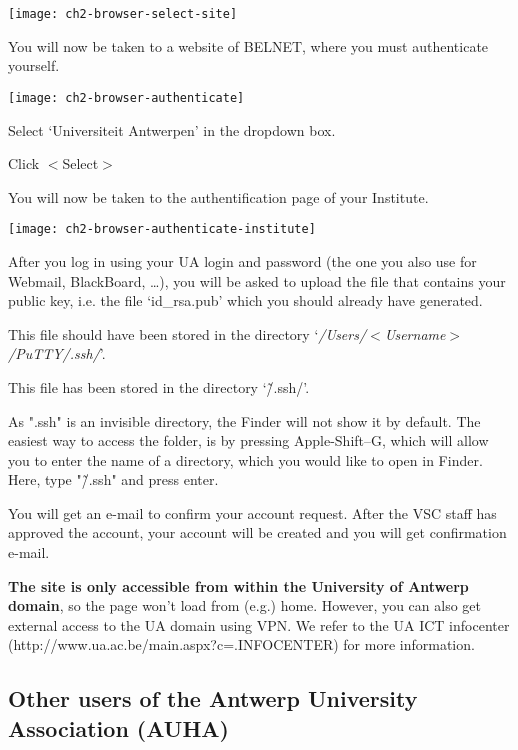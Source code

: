 \texttt{[image: ch2-browser-select-site]}

You will now be taken to a website of BELNET, where you must authenticate yourself.

\texttt{[image: ch2-browser-authenticate]}

Select `Universiteit Antwerpen' in the dropdown box.

Click $<$Select$>$

You will now be taken to the authentification page of your Institute.

\texttt{[image: ch2-browser-authenticate-institute]}

After you log in using your UA login and password (the one you also use for
Webmail, BlackBoard, \dots ), you will be asked to upload the file that
contains your public key, i.e. the file `id\_rsa.pub' which you should already
have generated.

\ifwindows

  This file should have been stored in the directory
  `\textit{/Users/$<$Username$>$/PuTTY/.ssh/}'.

\fi



\ifmac

  This file has been stored in the directory `\~/.ssh/'.

  \textbf{} As ".ssh" is an invisible directory, the Finder will
  not show it by default. The easiest way to access the folder, is by pressing
  Apple-Shift--G, which will allow you to enter the name of a directory, which
  you would like to open in Finder. Here, type "\~/.ssh" and press enter.

\fi

You will get an e-mail to confirm your account request. After the VSC staff has
approved the account, your account will be created and you will get
confirmation e-mail.

\textbf{The site is only accessible from within the University of Antwerp
domain}, so the page won't load from (e.g.) home. However, you can also get
external access to the UA domain using VPN. We refer to the UA ICT infocenter
(http://www.ua.ac.be/main.aspx?c=.INFOCENTER) for more information.

\subsection{Other users of the Antwerp University Association (AUHA)}
\label{sec:other-users-of-antwerp-university}

